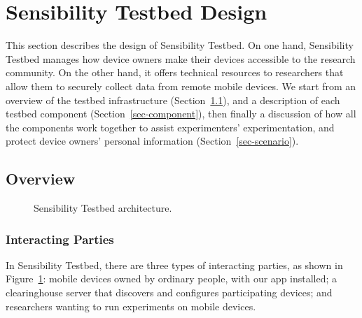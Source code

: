 \section{Sensibility Testbed Design}\label{sec-design}

This section describes the design of Sensibility Testbed. On one
hand, Sensibility Testbed manages how device owners make their
devices accessible to the research community. On the other hand,
it offers technical resources to researchers that allow them to
securely collect data from remote mobile devices. We start from 
an overview of the testbed infrastructure (Section~\ref{sec-overview}), 
and a description of each testbed component 
(Section~\ref{sec-component}), then finally a discussion of how all the 
components work together to assist experimenters' experimentation,
and protect device owners' personal information 
(Section~\ref{sec-scenario}).

\subsection{Overview}\label{sec-overview}

\begin{figure}
\caption{\small Sensibility Testbed architecture. 
\label{fig-arch}}
\end{figure}

\subsubsection{Interacting Parties}\label{sec-parties}
In Sensibility Testbed, there are three types of interacting
parties, as shown in Figure~\ref{fig-arch}: mobile devices 
owned by ordinary people, with our app installed; a 
clearinghouse server that discovers and configures
participating devices; and researchers wanting to run
experiments on mobile devices. 

